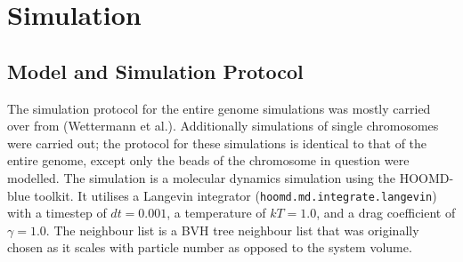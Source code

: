 
\chapter{Simulation} %
\label{cha:simulation}

\section{Model and Simulation Protocol} %
\label{sec:model_and_simulation_protocol}

The simulation protocol for the entire genome simulations was mostly carried over from (Wettermann et al.\cite{wettermann_minimal_2020}). Additionally simulations of single chromosomes were carried out; the protocol for these simulations is identical to that of the entire genome, except only the beads of the chromosome in question were modelled. The simulation is a molecular dynamics simulation using the HOOMD-blue\cite{anderson_hoomd-blue_2020} toolkit. It utilises a Langevin integrator (\verb|hoomd.md.integrate.langevin|) with a timestep of \(dt=0.001\), a temperature of \(kT = 1.0\), and a drag coefficient of \(\gamma = 1.0\). The neighbour list is a BVH tree neighbour list \cite{howard_efficient_2016} \cite{howard_quantized_2019} that was originally chosen as it scales
with particle number as opposed to the system volume\cite{wettermann_minimal_2020}.

